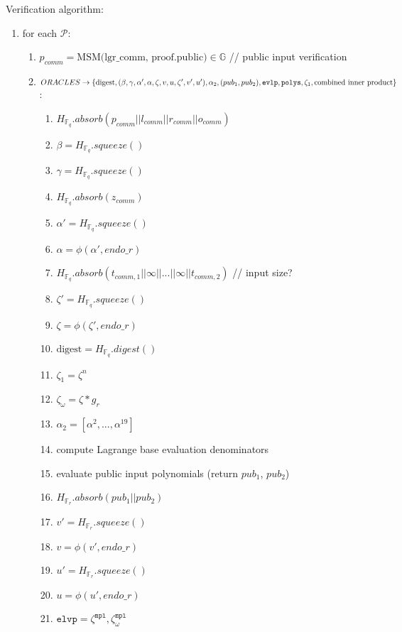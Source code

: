 Verification algorithm:
\begin{enumerate}
	\item for each $\mathcal{P}$:
	\begin{enumerate}
		\item $p_{comm} = \text{MSM(lgr\_comm, proof.public)} \in \mathbb{G}$ // public input verification
		\item $ORACLES \rightarrow \{\text{digest}, 
			(\beta, \gamma, \alpha', \alpha, \zeta, v, u, \zeta', v', u'), \\
			\alpha_2, (pub_1, pub_2), \texttt{evlp}, \texttt{polys}, \zeta_1, \text{combined inner product} \}$:
		\begin{enumerate}
			\item $H_{\mathbb{F}_q}.absorb(p_{comm} || l_{comm} || r_{comm} || o_{comm})$
			\item $\beta = H_{\mathbb{F}_q}.squeeze()$
			\item $\gamma = H_{\mathbb{F}_q}.squeeze()$
			\item $H_{\mathbb{F}_q}.absorb(z_{comm})$
			\item $\alpha' = H_{\mathbb{F}_q}.squeeze()$
			\item $\alpha = \phi(\alpha', endo\_r)$
			\item $H_{\mathbb{F}_q}.absorb(t_{comm, 1} || \infty || ... || \infty || t_{comm, 2})$  // input size? 
			\item $\zeta' = H_{\mathbb{F}_q}.squeeze()$
			\item $\zeta = \phi(\zeta', endo\_r)$
			\item $\text{digest} = H_{\mathbb{F}_q}.digest()$
			\item $\zeta_1 = \zeta^n$
			\item $\zeta_{\omega} = \zeta * g_r$
			\item $\alpha_2 = [\alpha^2, ..., \alpha^19]$ %
			\item compute Lagrange base evaluation denominators
			\item evaluate public input polynomials (return $pub_1$, $pub_2$)
			\item $H_{\mathbb{F}_r}.absorb(pub_1 || pub_2)$
			\item $v' = H_{\mathbb{F}_r}.squeeze()$
			\item $v = \phi(v', endo\_r)$
			\item $u' = H_{\mathbb{F}_r}.squeeze()$
			\item $u = \phi(u', endo\_r)$
			\item $\texttt{elvp} = {\zeta^{\texttt{mpl}}, \zeta_{\omega}^{\texttt{mpl}}}$

\end{enumerate}
\end{enumerate}
\end{enumerate}
